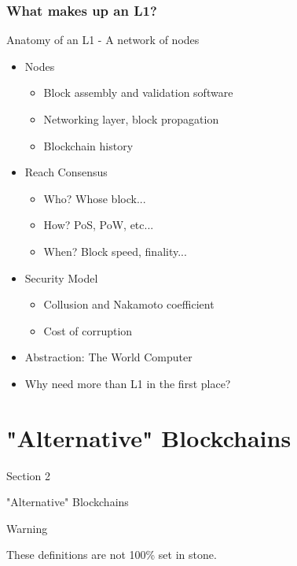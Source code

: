 \documentclass[aspectratio=169,xcolor=dvipsnames]{beamer}
\begin{document}
\subsubsection{What makes up an L1?}
    \begin{frame}{Anatomy of an L1 - A network of nodes}
    \begin{itemize}
        \item Nodes
        \begin{itemize}
            \item Block assembly and validation software
            \item Networking layer, block propagation
            \item Blockchain history
        \end{itemize}
        \item Reach Consensus
        \begin{itemize}
            \item Who? Whose block...
            \item How? PoS, PoW, etc... 
            \item When? Block speed, finality...
        \end{itemize}
        \item Security Model
        \begin{itemize}
            \item Collusion and Nakamoto coefficient
            \item Cost of corruption
        \end{itemize}
        \item Abstraction: The World Computer
        \item Why need more than L1 in the first place?
    \end{itemize}

\end{frame}

\section{"Alternative" Blockchains}
\begin{frame}{Section 2}
    \Huge{\centerline{"Alternative" Blockchains}}
\end{frame}
\begin{frame}{Warning}
    \Huge{\centerline{These definitions are not 100\% set in stone.}}
\end{frame}
\end{document}
